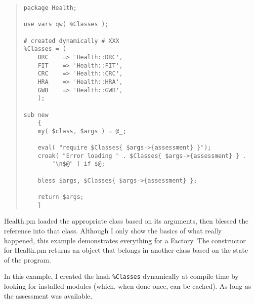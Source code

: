 \begin{quote}
\begin{verbatim}
package Health;

use vars qw( %Classes );

# created dynamically # XXX
%Classes = (
    DRC    => 'Health::DRC',
    FIT    => 'Health::FIT',
    CRC    => 'Health::CRC',
    HRA    => 'Health::HRA',
    GWB    => 'Health::GWB',
    );

sub new
    {
    my( $class, $args ) = @_;

    eval( "require $Classes{ $args->{assessment} }");
    croak( "Error loading " . $Classes{ $args->{assessment} } .
        "\n$@" ) if $@;

    bless $args, $Classes{ $args->{assessment} };

    return $args;
    }
\end{verbatim}
\end{quote}

Health.pm loaded the appropriate class based on its arguments,
then blessed the reference into that class.  Although I only
show the basics of what really happened, this example demonstrates
everything for a Factory.  The constructor for Health.pm returns
an object that belongs in another class based on the state
of the program.

In this example, I created the hash {\tt \%Classes} dynamically
at compile time by looking for installed modules (which, when
done once, can be cached).  As long as the assessment was 
available, 






